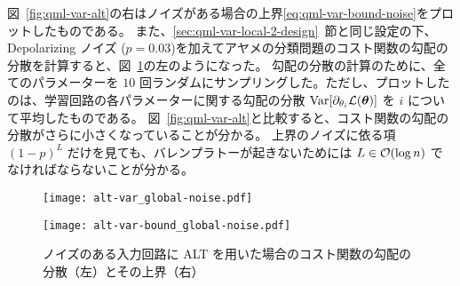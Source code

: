 図~\ref{fig:qml-var-alt}の右はノイズがある場合の上界\eqref{eq:qml-var-bound-noise}をプロットしたものである。
また、\ref{sec:qml-var-local-2-design}~節と同じ設定の下、Depolarizing ノイズ ($p=0.03$)を加えてアヤメの分類問題のコスト関数の勾配の分散を計算すると、図~\ref{fig:qml-var-alt-noise}の左のようになった。
勾配の分散の計算のために、全てのパラメーターを $10$ 回ランダムにサンプリングした。ただし、プロットしたのは、学習回路の各パラメーターに関する勾配の分散 $\operatorname{Var}[\partial_{\theta_i} \mathcal{L}(\boldsymbol{\theta})]$ を $i$ について平均したものである。
図~\ref{fig:qml-var-alt}と比較すると、コスト関数の勾配の分散がさらに小さくなっていることが分かる。
上界のノイズに依る項 $(1-p)^L$ だけを見ても、バレンプラトーが起きないためには $L \in \order{\log{n}}$ でなければならないことが分かる。
\begin{figure}[H]
    \begin{minipage}[b]{0.5\columnwidth}
        \centering
        \texttt{[image: alt-var\_global-noise.pdf]}
    \end{minipage}
    \hspace{0\columnwidth}
    \begin{minipage}[b]{0.5\columnwidth}
        \centering
        \texttt{[image: alt-var-bound\_global-noise.pdf]}
    \end{minipage}
    \caption{ノイズのある入力回路に ALT を用いた場合のコスト関数の勾配の分散（左）とその上界（右）}
    \label{fig:qml-var-alt-noise}
\end{figure}
